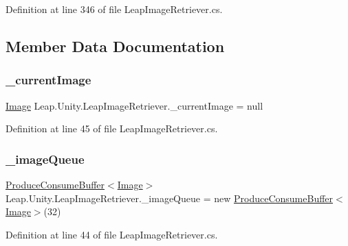 Definition at line 346 of file Leap\+Image\+Retriever.\+cs.



\subsection{Member Data Documentation}
\mbox{\label{class_leap_1_1_unity_1_1_leap_image_retriever_a37dadc2f80f08889282e75bf2369eac9}} 
\subsubsection{\texorpdfstring{\_currentImage}{\_currentImage}}
{\footnotesize\ttfamily \mbox{\hyperlink{class_leap_1_1_image}{Image}} Leap.\+Unity.\+Leap\+Image\+Retriever.\+\_\+current\+Image = null\hspace{0.3cm}{\ttfamily [protected]}}



Definition at line 45 of file Leap\+Image\+Retriever.\+cs.

\mbox{\label{class_leap_1_1_unity_1_1_leap_image_retriever_a7001f70802cdb736676edb6696fae43b}} 
\subsubsection{\texorpdfstring{\_imageQueue}{\_imageQueue}}
{\footnotesize\ttfamily \mbox{\hyperlink{class_leap_1_1_unity_1_1_produce_consume_buffer}{Produce\+Consume\+Buffer}}$<$\mbox{\hyperlink{class_leap_1_1_image}{Image}}$>$ Leap.\+Unity.\+Leap\+Image\+Retriever.\+\_\+image\+Queue = new \mbox{\hyperlink{class_leap_1_1_unity_1_1_produce_consume_buffer}{Produce\+Consume\+Buffer}}$<$\mbox{\hyperlink{class_leap_1_1_image}{Image}}$>$(32)\hspace{0.3cm}{\ttfamily [protected]}}



Definition at line 44 of file Leap\+Image\+Retriever.\+cs.

